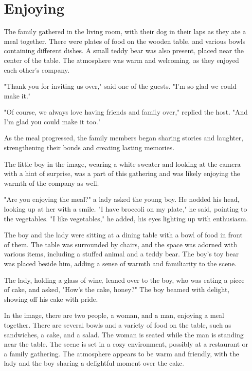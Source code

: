 \documentclass[smalldemyvopaper,11pt,twoside,onecolumn,openright,extrafontsizes]{memoir}
\begin{document}
\chapter{Enjoying}
The family gathered in the living room, with their dog in their laps as they ate a meal together. There were plates of food on the wooden table, and various bowls containing different dishes. A small teddy bear was also present, placed near the center of the table. The atmosphere was warm and welcoming, as they enjoyed each other's company.\par
"Thank you for inviting us over," said one of the guests. "I'm so glad we could make it."\par
"Of course, we always love having friends and family over," replied the host. "And I'm glad you could make it too."\par
As the meal progressed, the family members began sharing stories and laughter, strengthening their bonds and creating lasting memories.\par
The little boy in the image, wearing a white sweater and looking at the camera with a hint of surprise, was a part of this gathering and was likely enjoying the warmth of the company as well.\par
"Are you enjoying the meal?" a lady asked the young boy. He nodded his head, looking up at her with a smile. "I have broccoli on my plate," he said, pointing to the vegetables. "I like vegetables," he added, his eyes lighting up with enthusiasm.\par
The boy and the lady were sitting at a dining table with a bowl of food in front of them. The table was surrounded by chairs, and the space was adorned with various items, including a stuffed animal and a teddy bear. The boy's toy bear was placed beside him, adding a sense of warmth and familiarity to the scene.\par
The lady, holding a glass of wine, leaned over to the boy, who was eating a piece of cake, and asked, "How's the cake, honey?" The boy beamed with delight, showing off his cake with pride.\par
In the image, there are two people, a woman, and a man, enjoying a meal together. There are several bowls and a variety of food on the table, such as sandwiches, a cake, and a salad. The woman is seated while the man is standing near the table. The scene is set in a cozy environment, possibly at a restaurant or a family gathering. The atmosphere appears to be warm and friendly, with the lady and the boy sharing a delightful moment over the cake.\par
\end{document}
